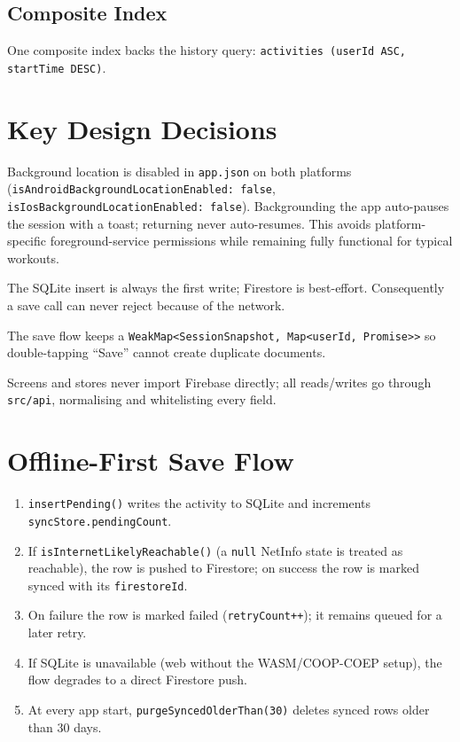 \documentclass[11pt,a4paper]{report}
\begin{document}
\subsection{Composite Index}
One composite index backs the history query: \texttt{activities (userId ASC, startTime DESC)}.

\section{Key Design Decisions}
\label{sec:foreground-only}
\begin{description}[style=nextline]
    \item[Foreground-only tracking.] Background location is disabled in \texttt{app.json} on both platforms (\texttt{isAndroidBackgroundLocationEnabled: false}, \texttt{isIosBackgroundLocationEnabled: false}). Backgrounding the app auto-pauses the session with a toast; returning never auto-resumes. This avoids platform-specific foreground-service permissions while remaining fully functional for typical workouts.
    \item[Local-first writes.] The SQLite insert is always the first write; Firestore is best-effort. Consequently a save call can never reject because of the network.
    \item[Duplicate-save protection.] The save flow keeps a \texttt{WeakMap<SessionSnapshot, Map<userId, Promise>>} so double-tapping ``Save'' cannot create duplicate documents.
    \item[Repository-only data access.] Screens and stores never import Firebase directly; all reads/writes go through \texttt{src/api}, normalising and whitelisting every field.
\end{description}

\section{Offline-First Save Flow}
\label{sec:saveflow}
\begin{enumerate}[nosep]
    \item \texttt{insertPending()} writes the activity to SQLite and increments \texttt{syncStore.pendingCount}.
    \item If \texttt{isInternetLikelyReachable()} (a \texttt{null} NetInfo state is treated as reachable), the row is pushed to Firestore; on success the row is marked synced with its \texttt{firestoreId}.
    \item On failure the row is marked failed (\texttt{retryCount++}); it remains queued for a later retry.
    \item If SQLite is unavailable (web without the WASM/COOP-COEP setup), the flow degrades to a direct Firestore push.
    \item At every app start, \texttt{purgeSyncedOlderThan(30)} deletes synced rows older than 30 days.
\end{enumerate}
\end{document}
